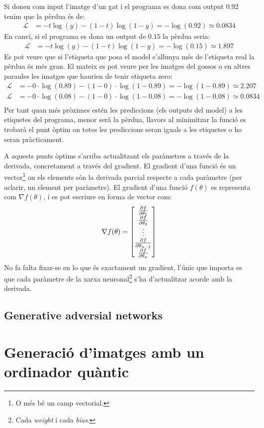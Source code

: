 Si donen com input l'imatge d'un gat i el programa es dona com output $0.92$ tenim que la pèrdua és de:
\begin{align*}
	\mathcal{L} &= - t\log(y) - (1 - t)\log(1 - y) = - \log(0.92) \simeq 0.0834
\end{align*}
En canvi, si el programa es dona un output de $0.15$ la pèrdua seria:
\begin{align*}
	\mathcal{L} &= - t\log(y) - (1 - t)\log(1 - y) = - \log(0.15) \simeq 1.897
\end{align*}
Es pot veure que si l'etiqueta que posa el model s'allunya més de l'etiqueta real la pèrdua és més gran. El mateix es pot veure per les imatges del gossos o en altres paraules les imatges que haurien de tenir etiqueta zero:
\begin{align*}
	\mathcal{L} &= - 0\cdot\log(0.89) - (1 - 0)\cdot\log(1 - 0.89) = - \log(1- 0.89) \simeq 2.207 \\
	\mathcal{L} &= - 0\cdot\log(0.08) - (1 - 0)\cdot\log(1 - 0.08) = - \log(1- 0.08)\simeq 0.0834 \\
\end{align*}
Per tant quan més pròximes estén les prediccions (els outputs del model) a les etiquetes del programa, menor serà la pèrdua, llavors al minimitzar la funció es trobarà el punt òptim on totes les prediccions seran iguals a les etiquetes o ho seran pràcticament. 

A aquests punts òptims s'arriba actualitzant els paràmetres a través de la derivada, concretament a través del gradient. El gradient d'una funció és un vector\footnote{O més bé un camp vectorial.} on els elements són la derivada parcial respecte a cada paràmetre (per aclarir, un element per paràmetre). El gradient d'una funció $f(\theta)$ es representa com $\nabla f(\theta)$, i es pot escriure en forma de vector com:
$$
\nabla f(\theta) = \begin{bmatrix}
	\pdv{f}{\theta_1} \\
	\pdv{f}{\theta_2} \\
	\vdots \\
	\pdv{f}{\theta_{n-1}} \\
	\pdv{f}{\theta_{n}}
\end{bmatrix}
$$
No fa falta fixar-se en lo que és exactament un gradient, l'únic que importa es que cada paràmetre de la xarxa neuronal\footnote{Cada \textit{weight} i cada \textit{bias}.} s'ha d'actualitzar acorde amb la derivada.  

\section{Generative adversial networks}

\chapter{Generació d'imatges amb un ordinador quàntic}
